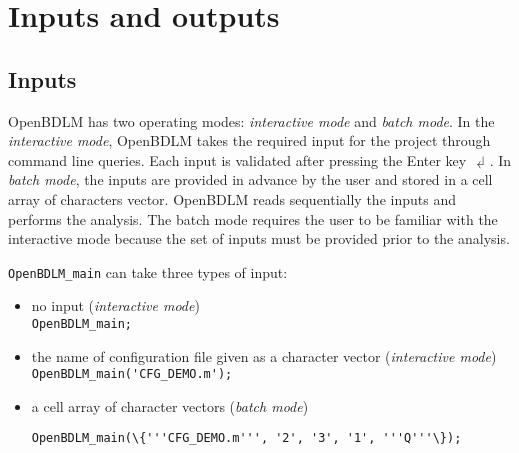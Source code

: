 \section{Inputs and outputs}
\label{S:OpenBDLMINPUTOUTPUT}

\subsection{Inputs}
\label{SS:OpenBDLMinput}


OpenBDLM has two operating modes: \emph{interactive mode} and \emph{batch mode}. In the \emph{interactive mode}, OpenBDLM takes the required input for the project through \MATLAB{} command line queries. Each input is validated after pressing the Enter key $\dlsh$. In \emph{batch mode}, the inputs are provided in advance by the user and stored in a cell array of characters vector. OpenBDLM reads sequentially the inputs and performs the analysis. The batch mode requires the user to be familiar with the interactive mode because the set of inputs must be provided prior to the analysis. {\lstinline[basicstyle = \mlttfamily \small]!OpenBDLM_main! can take three types of input:
\begin{itemize}
  \item no input (\emph{interactive mode}) \\ 
  
  \colorbox{light-gray}{\lstinline[basicstyle = \mlttfamily \small]!OpenBDLM_main;!} \\  
  \item the name of configuration file given as a character vector  (\emph{interactive mode}) \\ 
  
    \colorbox{light-gray}{\lstinline[basicstyle = \mlttfamily \small]!OpenBDLM_main('CFG_DEMO.m');!} \\ 
      
  \item a cell array of character vectors  (\emph{batch mode}) \\
  
\raggedright{\colorbox{light-gray}{\lstinline[basicstyle = \mlttfamily \small]!OpenBDLM_main(\{'''CFG_DEMO.m''', '2', '3', '1', '''Q'''\});!}} \\
\end{itemize}

}
